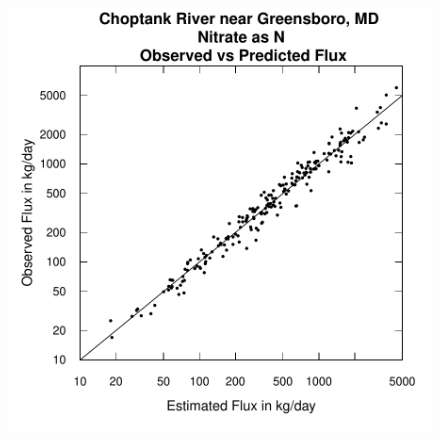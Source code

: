 \documentclass[a4paper,11pt]{article}
\begin{document}
\begin{figure}[htbp]
  \begin{minipage}[h]{0.5\linewidth}
    \begin{center}

\includegraphics{EGRET-figplotLogFluxPred}
    \label{fig:plotLogFluxPred}
    \end{center}
  \end{minipage}
  \begin{minipage}[h]{0.5\linewidth}
    \begin{center}



\end{center}
\end{minipage}
\end{figure}
\end{document}
